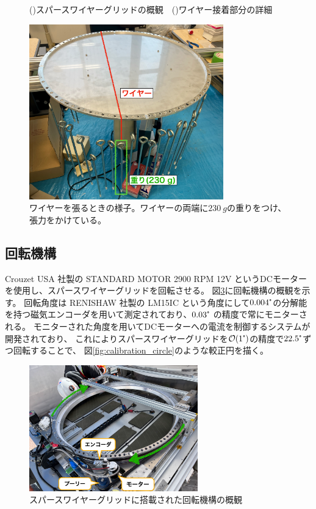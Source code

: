 \documentclass[../../main.tex]{subfiles}
\begin{document}
\begin{figure}[H]
\begin{minipage}[b]{0.48\columnwidth}
        \subcaption{}
        \label{fig:wire_detail_view}
    \end{minipage}
    \caption{()スパースワイヤーグリッドの概観~\cite{swg:Murata_2023}\ ()ワイヤー接着部分の詳細}
    \label{fig:swg}
\end{figure}
\begin{figure}[H]
    \centering
    \includegraphics[width=0.75\textwidth]{wiregrid/wire_attachment.pdf}
    \caption[ワイヤーを張るときの様子]{ワイヤーを張るときの様子。ワイヤーの両端に$\SI{230}{g}$の重りをつけ、張力をかけている。}
    \label{fig:wire_attachment}
\end{figure}
\subsection{回転機構}
Crouzet USA 社製の STANDARD MOTOR 2900 RPM 12V というDCモーターを使用し、スパースワイヤーグリッドを回転させる。
図\ref{fig:rotation_parts}に回転機構の概観を示す。
回転角度は RENISHAW 社製の LM15IC という角度にして$0.004\tcdegree$の分解能を持つ磁気エンコーダを用いて測定されており、$0.03\tcdegree$ の精度で常にモニターされる。
モニターされた角度を用いてDCモーターへの電流を制御するシステムが開発されており、
これによりスパースワイヤーグリッドを$\order{1\tcdegree}$の精度で$22.5\tcdegree$ずつ回転することで、
図\ref{fig:calibration_circle}のような較正円を描く\cite{swg:nakata}。
\begin{figure}[H]
    \centering
    \includegraphics[width=0.65\textwidth]{wiregrid/rotation_parts.pdf}
    \caption{スパースワイヤーグリッドに搭載された回転機構の概観}
    \label{fig:rotation_parts}
\end{figure}
\end{document}
